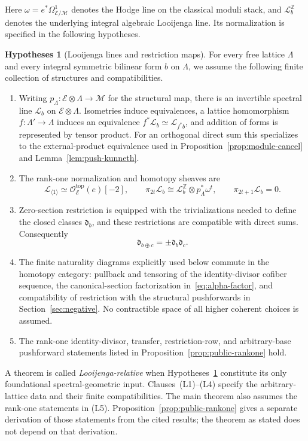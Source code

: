 \documentclass[11pt,a4paper]{amsart}
\newcommand{\Z}{\mathbb Z}
\newcommand{\cM}{\mathcal M}
\newcommand{\cE}{\mathcal E}
\newcommand{\cL}{\mathcal L}
\newcommand{\cO}{\mathcal O}
\newcommand{\dclass}{\mathfrak d}
\theoremstyle{plain}
\theoremstyle{definition}
\newtheorem{assumption}[theorem]{Hypotheses}
\theoremstyle{remark}
\begin{document}
Here $\omega=e^*\Omega^1_{\cE/\cM}$ denotes the Hodge line on the
classical moduli stack, and $\cL_b^{\Z}$ denotes the underlying
integral algebraic Looijenga line. Its normalization is specified
in the following hypotheses.

\begin{assumption}[Looijenga lines and restriction maps]\label{contract:foundational}
For every free lattice $\Lambda$ and every integral symmetric
bilinear form $b$ on $\Lambda$, we assume the following finite
collection of structures and compatibilities.
\begin{enumerate}[label=\textup{(L\arabic*)},leftmargin=2.8em]
\item Writing $p_\Lambda:\cE\otimes\Lambda\to\cM$ for the
structural map, there is an invertible spectral line $\cL_b$
on $\cE\otimes\Lambda$. Isometries induce equivalences, a
lattice homomorphism $f:\Lambda'\to\Lambda$ induces an equivalence
$f^*\cL_b\simeq\cL_{f^*b}$, and addition of forms is represented
by tensor product. For an orthogonal direct sum this specializes
to the external-product equivalence used in
Proposition~\ref{prop:module-cancel} and
Lemma~\ref{lem:push-kunneth}.
\item The rank-one normalization and homotopy sheaves are
\[
 \cL_{\langle1\rangle}\simeq\cO_{\cE}^{\mathrm{top}}(e)[-2],
 \qquad
 \pi_{2t}\cL_b\cong\cL_b^{\Z}\otimes p_\Lambda^*\omega^t,
 \qquad
 \pi_{2t+1}\cL_b=0.
\]
\item Zero-section restriction is equipped with the trivializations
needed to define the closed classes $\dclass_b$, and these
restrictions are compatible with direct sums. Consequently
\[
 \dclass_{b\oplus c}=\pm\dclass_b\dclass_c.
\]
\item The finite naturality diagrams explicitly used below commute
in the homotopy category: pullback and tensoring of the
identity-divisor cofiber sequence, the canonical-section
factorization in~\eqref{eq:alpha-factor}, and compatibility of
restriction with the structural pushforwards in
Section~\ref{sec:negative}. No contractible space of all higher
coherent choices is assumed.
\item The rank-one identity-divisor, transfer, restriction-row,
and arbitrary-base pushforward statements listed in
Proposition~\ref{prop:public-rankone} hold.
\end{enumerate}
\end{assumption}

A theorem is called \emph{Looijenga-relative} when
Hypotheses~\ref{contract:foundational} constitute its only
foundational spectral-geometric input. Clauses~\textup{(L1)}--\textup{(L4)}
specify the arbitrary-lattice data and their finite compatibilities.
The main theorem also assumes the rank-one statements in
\textup{(L5)}. Proposition~\ref{prop:public-rankone} gives a
separate derivation of those statements from the cited results;
the theorem as stated does not depend on that derivation.
\end{document}
